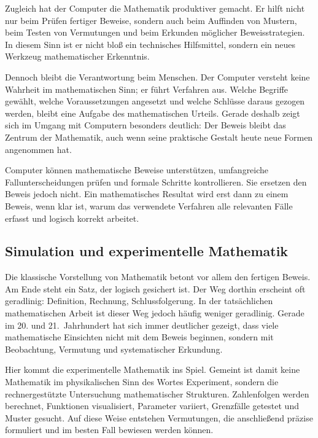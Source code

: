 Zugleich hat der Computer die Mathematik produktiver gemacht. Er hilft nicht nur beim Prüfen fertiger Beweise, sondern auch beim Auffinden von Mustern, beim Testen von Vermutungen und beim Erkunden möglicher Beweisstrategien. In diesem Sinn ist er nicht bloß ein technisches Hilfsmittel, sondern ein neues Werkzeug mathematischer Erkenntnis.

Dennoch bleibt die Verantwortung beim Menschen. Der Computer versteht keine Wahrheit im mathematischen Sinn; er führt Verfahren aus. Welche Begriffe gewählt, welche Voraussetzungen angesetzt und welche Schlüsse daraus gezogen werden, bleibt eine Aufgabe des mathematischen Urteils. Gerade deshalb zeigt sich im Umgang mit Computern besonders deutlich: Der Beweis bleibt das Zentrum der Mathematik, auch wenn seine praktische Gestalt heute neue Formen angenommen hat.

\begin{DidacticBox}
	\label{box:computer-beweis}
	Computer können mathematische Beweise unterstützen, umfangreiche Fallunterscheidungen prüfen und formale Schritte kontrollieren. Sie ersetzen den Beweis jedoch nicht. Ein mathematisches Resultat wird erst dann zu einem Beweis, wenn klar ist, warum das verwendete Verfahren alle relevanten Fälle erfasst und logisch korrekt arbeitet.
\end{DidacticBox}


\subsection{Simulation und experimentelle Mathematik}

Die klassische Vorstellung von Mathematik betont vor allem den fertigen Beweis. Am Ende steht ein Satz, der logisch gesichert ist. Der Weg dorthin erscheint oft geradlinig: Definition, Rechnung, Schlussfolgerung. In der tatsächlichen mathematischen Arbeit ist dieser Weg jedoch häufig weniger geradlinig. Gerade im 20. und 21.~Jahrhundert hat sich immer deutlicher gezeigt, dass viele mathematische Einsichten nicht mit dem Beweis beginnen, sondern mit Beobachtung, Vermutung und systematischer Erkundung.

Hier kommt die experimentelle Mathematik ins Spiel. Gemeint ist damit keine Mathematik im physikalischen Sinn des Wortes \glqq Experiment\grqq{}, sondern die rechnergestützte Untersuchung mathematischer Strukturen. Zahlenfolgen werden berechnet, Funktionen visualisiert, Parameter variiert, Grenzfälle getestet und Muster gesucht. Auf diese Weise entstehen Vermutungen, die anschließend präzise formuliert und im besten Fall bewiesen werden können.

